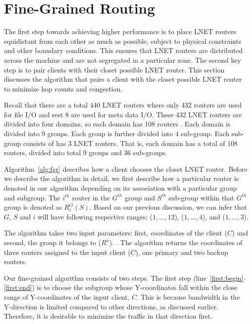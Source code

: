 \section{Fine-Grained Routing}


The first step towards achieving higher performance is to place LNET routers equidistant from each other as much as possible,
subject to physical constraints and other boundary conditions. This ensures that LNET routers are distributed across the machine
and are not segregated in a particular zone. The second key step is to pair clients with their closet possible LNET router. This 
section discusses the algorithm that pairs a client with the closet possible LNET router to minimize hop counts and congestion.

Recall that there are a total 440 LNET routers where only 432 routers are used for file I/O and rest 8 are used for meta data I/O.
These 432 LNET routers are divided into four domains, so each domain has 108 routers . Each
domain is divided into 9 groups. Each group is further divided into 4 sub-group. Each sub-group consists of has 3 LNET routers. That 
is, each domain has a total of 108 routers, divided into total 9 groups and 36 sub-groups.


Algorithm~\ref{alg:fgr} describes how a client chooses the closet LNET router. Before we describe the algorithm in detail, we first
describe how a particular router is denoted in our algorithm depending on its association with a particular group and subgroup. The 
$i^{th}$ router in the $G^{th}$ group and $S^{th}$ sub-group within that $G^{th}$ group is denoted as $R^G_{i}(S)$. Based on 
our previous discussion, we can infer that $G$, $S$ and $i$ will have following respective ranges: ($1, \dots, 12$), ($1, \dots, 4$), 
and ($1, \dots, 3$).

The algorithm takes two input parameters: first, coordinates of the client ($C$) and second, the group it belongs to ($R^x$). . The algorithm returns the coordinates of three routers assigned to the input client ($C$),
one primary and two backup routers.

Our fine-grained algorithm consists of two steps. The first step (line~\ref{first:begin}--\ref{first:end}) is to choose the subgroup whose 
Y-coordinates fall within the close range of Y-coordinates of the input client, $C$. This is because bandwidth in the Y-direction is limited
compared to other directions, as discussed earlier. Therefore, it is desirable to minimize the traffic in that direction first. 

